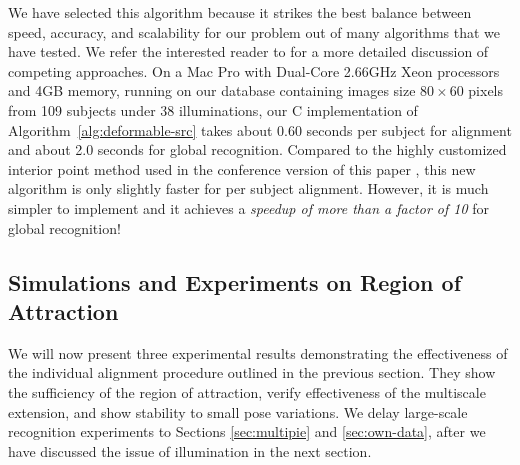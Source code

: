 \documentclass[10pt,journal,letterpaper,compsoc]{IEEEtran} %
\begin{document}
We have selected this algorithm because it strikes the best
balance between speed, accuracy, and scalability for our problem out of
many algorithms that we have tested. We refer the interested reader to
\cite{YangA2010-pp} for a more detailed discussion of competing
approaches.  On a Mac Pro with
Dual-Core 2.66GHz Xeon processors and 4GB memory,
running on our database containing images size $80\times 60$
pixels from 109 subjects under 38 illuminations,
our C implementation of Algorithm~\ref{alg:deformable-src} takes
about 0.60 seconds per subject for alignment and about 2.0
seconds for global recognition. Compared to the highly
customized interior point method used in the conference version
of this paper \cite{Wagner2009-CVPR}, this new algorithm is
only slightly faster for per subject alignment. However, it is
much simpler to implement and it achieves a
\emph{speedup of more than a factor of 10} for global
recognition!

\subsection{Simulations and Experiments on Region of
Attraction} We will now present three experimental results
demonstrating the effectiveness of the individual alignment
procedure outlined in the previous section. They show the sufficiency of the
region of attraction, verify effectiveness of the multiscale extension,
and show stability to small pose variations.  We delay large-scale recognition experiments
to Sections \ref{sec:multipie} and \ref{sec:own-data}, after we
have discussed the issue of illumination in the next section.
\end{document}
